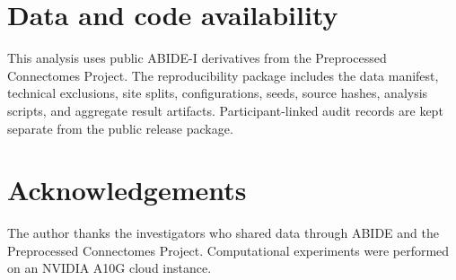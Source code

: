 \documentclass[conference]{IEEEtran}
\begin{document}
\maketitle








\section*{Data and code availability}
This analysis uses public ABIDE-I derivatives from the Preprocessed
Connectomes Project. The reproducibility package includes the data manifest,
technical exclusions, site splits, configurations, seeds, source hashes,
analysis scripts, and aggregate result artifacts. Participant-linked audit
records are kept separate from the public release package.

\section*{Acknowledgements}
The author thanks the investigators who shared data through ABIDE and the
Preprocessed Connectomes Project. Computational experiments were performed on
an NVIDIA A10G cloud instance.



\end{document}

